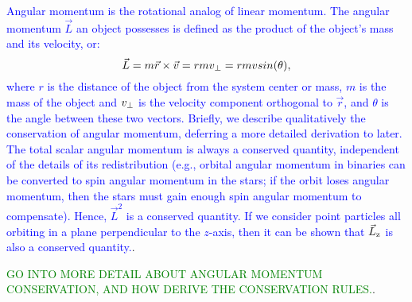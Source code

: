\documentclass[main.tex]{subfiles}
\begin{document}
\begin{tcolorbox}[sharp corners, colback=blue!30, colframe=blue!80!blue, title=Angular Momentum I$^3$]
\par \textcolor{blue} {Angular momentum is the rotational analog of linear momentum.  The angular momentum $\vec{L}$ an object possesses is defined as the product of the object's mass and its velocity, or:
\begin{equation}
\vec{L} = m\vec{r} \times \vec{v} = rmv_{\rm \perp} = rmvsin(\theta),
\end{equation}
where $r$ is the distance of the object from the system center or mass, $m$ is the mass of the object and $v_{\rm \perp}$ is the velocity component orthogonal to $\vec{r}$, and $\theta$ is the angle between these two vectors. 
Briefly, we describe qualitatively the conservation of angular momentum, deferring a more detailed derivation to later.  The total scalar angular momentum is always a conserved quantity, independent of the details of its redistribution (e.g., orbital angular momentum in binaries can be converted to spin angular momentum in the stars; if the orbit loses angular momentum, then the stars must gain enough spin angular momentum to compensate).  Hence, $\vec{L}^2$ is a conserved quantity.  If we consider point particles all orbiting in a plane perpendicular to the $z$-axis, then it can be shown that $\vec{L}_{\rm z}$ is also a conserved quantity.}.  
\end{tcolorbox}

\begin{tcolorbox}[sharp corners, colback=green!30, colframe=green!80!blue, title=Angular Momentum II$^4$]
\par \textcolor{green} {GO INTO MORE DETAIL ABOUT ANGULAR MOMENTUM CONSERVATION, AND HOW DERIVE THE CONSERVATION RULES.}.  
\end{tcolorbox}
\end{document}
